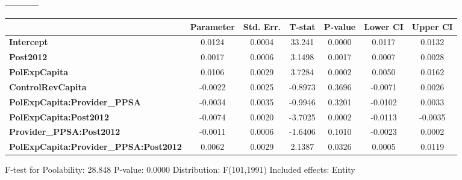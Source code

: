 \begin{center}
\begin{tabular}{lclc}
\textbf{}                                     &                    & \textbf{                     }   &                  \\
\bottomrule
\end{tabular}
\begin{tabular}{lcccccc}
                                              & \textbf{Parameter} & \textbf{Std. Err.} & \textbf{T-stat} & \textbf{P-value} & \textbf{Lower CI} & \textbf{Upper CI}  \\
\midrule
\textbf{Intercept}                            &       0.0124       &       0.0004       &      33.241     &      0.0000      &       0.0117      &       0.0132       \\
\textbf{Post2012}                             &       0.0017       &       0.0006       &      3.1498     &      0.0017      &       0.0007      &       0.0028       \\
\textbf{PolExpCapita}                         &       0.0106       &       0.0029       &      3.7284     &      0.0002      &       0.0050      &       0.0162       \\
\textbf{ControlRevCapita}                     &      -0.0022       &       0.0025       &     -0.8973     &      0.3696      &      -0.0071      &       0.0026       \\
\textbf{PolExpCapita:Provider\_PPSA}          &      -0.0034       &       0.0035       &     -0.9946     &      0.3201      &      -0.0102      &       0.0033       \\
\textbf{PolExpCapita:Post2012}                &      -0.0074       &       0.0020       &     -3.7025     &      0.0002      &      -0.0113      &      -0.0035       \\
\textbf{Provider\_PPSA:Post2012}              &      -0.0011       &       0.0006       &     -1.6406     &      0.1010      &      -0.0023      &       0.0002       \\
\textbf{PolExpCapita:Provider\_PPSA:Post2012} &       0.0062       &       0.0029       &      2.1387     &      0.0326      &       0.0005      &       0.0119       \\
\bottomrule
\end{tabular}
\end{center}

F-test for Poolability: 28.848 \newline
 P-value: 0.0000 \newline
 Distribution: F(101,1991) \newline
  \newline
 Included effects: Entity